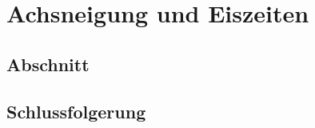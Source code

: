%
%
%
\chapter{Achsneigung und Eiszeiten\label{chapter:neigung}}
\begin{refsection}

\section{Abschnitt}

\section{Schlussfolgerung}

\printbibliography[heading=subbibliography]
\end{refsection}

